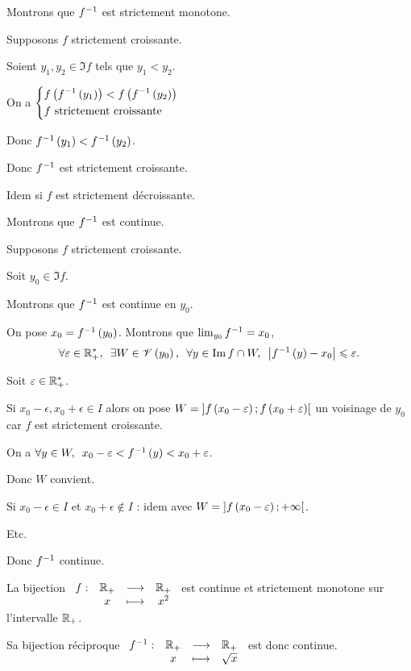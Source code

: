 \begin{dem}
Montrons que \(f^{-1}\) est strictement monotone.

Supposons \(f\) strictement croissante.

Soient \(y_1,y_2\in\Im f\) tels que \(y_1<y_2\).

On a \(\begin{dcases}f\left(f^{-1}\left(y_1\right)\right)<f\left(f^{-1}\left(y_2\right)\right) \\ f\text{ strictement croissante}\end{dcases}\)

Donc \(f^{-1}\left(y_1\right)<f^{-1}\left(y_2\right)\).

Donc \(f^{-1}\) est strictement croissante.

Idem si \(f\) est strictement décroissante.

Montrons que \(f^{-1}\) est continue.

Supposons \(f\) strictement croissante.

Soit \(y_0\in\Im f\).

Montrons que \(f^{-1}\) est continue en \(y_0\).

On pose \(x_0=f^{-1}\left(y_0\right)\). Montrons que \(\lim_{y_0}f^{-1}=x_0\), \cad \[\quantifs{\forall\epsilon\in\Rps;\exists W\in\V{y_0};\forall y\in\Im f\inter W}\abs{f\inv\paren{y}-x_0}\leq\epsilon.\]

Soit \(\varepsilon\in\mathbb{R}_+^*\).

Si \(x_0-\epsilon,x_0+\epsilon\in I\) alors on pose \(W=\left]f\left(x_0-\varepsilon\right);f\left(x_0+\varepsilon\right)\right[\) un voisinage de \(y_0\) car \(f\) est strictement croissante.

On a \(\quantifs{\forall y\in W}x_0-\epsilon<f\inv\paren{y}<x_0+\epsilon\).

Donc \(W\) convient.

Si \(x_0-\epsilon\in I\) et \(x_0+\epsilon\not\in I\) : idem avec \(W=\left]f\left(x_0-\varepsilon\right);+\infty\right[\).

Etc.

Donc \(f^{-1}\) continue.
\end{dem}

\begin{ex}
La bijection \(\begin{array}[t]{cccc}f : & \mathbb{R}_+ & \longrightarrow & \mathbb{R}_+ \\ & x & \longmapsto & x^2\end{array}\) est continue et strictement monotone sur l'intervalle \(\mathbb{R}_+\).

Sa bijection réciproque \(\begin{array}[t]{cccc}f^{-1} : & \mathbb{R}_+ & \longrightarrow & \mathbb{R}_+ \\ & x & \longmapsto & \sqrt{x}\end{array}\) est donc continue.
\end{ex}

